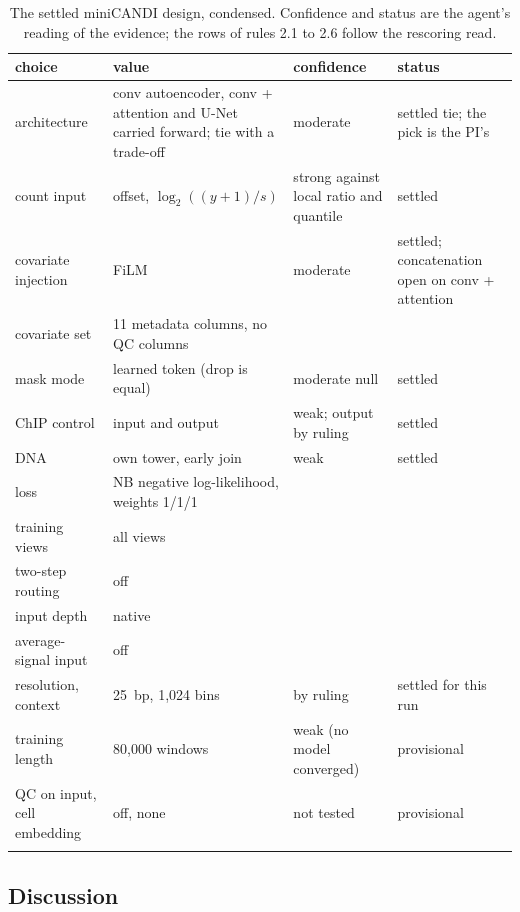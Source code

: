 \documentclass[pdflatex,sn-mathphys-num]{sn-jnl}
\newcommand{\lit}[1]{#1}
\newcommand{\cl}[1]{#1}
\begin{document}
\begin{table}[!htbp]
\caption{\cl{The settled miniCANDI design, condensed. Confidence and status are the agent's reading of the evidence; the rows of rules \lit{2.1} to \lit{2.6} follow the rescoring read.}}\label{tab:design}
\scriptsize
\begin{tabular}{p{2.8cm}p{4.3cm}p{2.0cm}p{2.9cm}}
\toprule
choice & value & confidence & status \\
\midrule
architecture & conv autoencoder, conv + attention and U-Net carried forward; tie with a trade-off & moderate & settled tie; the pick is the PI's \\
count input & offset, $\log_{\lit{2}}((y+\lit{1})/s)$ & strong against local ratio and quantile & settled \\
covariate injection & FiLM & moderate & settled; concatenation open on conv + attention \\
covariate set & \lit{11} metadata columns, no QC columns & \dsCovConf{} & \dsCovStatus{} \\
mask mode & learned token (drop is equal) & moderate null & settled \\
ChIP control & input and output & weak; output by ruling & settled \\
DNA & own tower, early join & weak & settled \\
loss & NB negative log-likelihood, weights \lit{1}/\lit{1}/\lit{1} & \dsLossConf{} & \dsLossStatus{} \\
training views & all views & \dsViewsConf{} & \dsViewsStatus{} \\
two-step routing & off & \dsTwostepConf{} & \dsTwostepStatus{} \\
input depth & native & \dsDepthConf{} & \dsDepthStatus{} \\
average-signal input & off & \dsAvgConf{} & \dsAvgStatus{} \\
resolution, context & \lit{25}~bp, \lit{1,024} bins & by ruling & settled for this run \\
training length & \lit{80,000} windows & weak (no model converged) & provisional \\
QC on input, cell embedding & off, none & not tested & provisional \\
\botrule
\end{tabular}
\end{table}

\subsection{Discussion}
\end{document}

